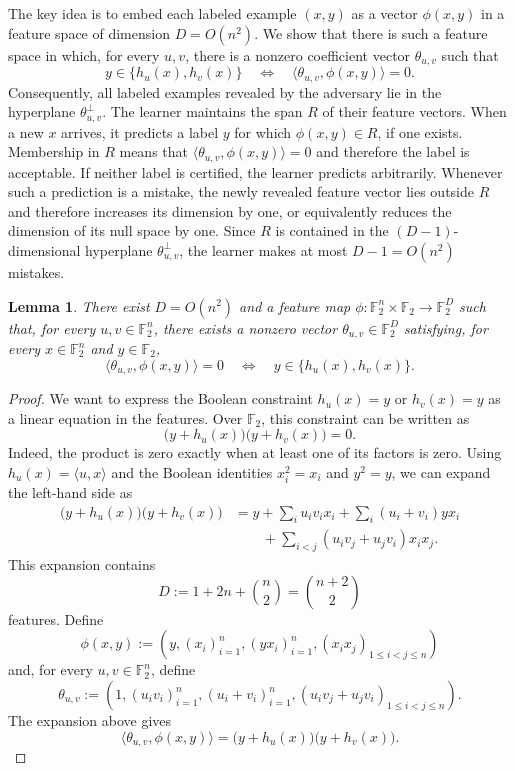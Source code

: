 \documentclass[11pt]{article}
\newtheorem{lemma}[theorem]{Lemma}
\theoremstyle{remark}
\begin{document}
The key idea is to embed each labeled example $(x,y)$ as a vector $\phi(x,y)$ in a feature space of dimension $D=O(n^2)$. We show that there is such a feature space in which, for every $u,v$, there is a nonzero coefficient vector $\theta_{u,v}$ such that
\[
    y\in\{h_u(x),h_v(x)\}
    \quad\Longleftrightarrow\quad
    \langle\theta_{u,v},\phi(x,y)\rangle=0.
\]
Consequently, all labeled examples revealed by the adversary lie in the hyperplane $\theta_{u,v}^{\perp}$. The learner maintains the span $R$ of their feature vectors. When a new $x$ arrives, it predicts a label $y$ for which $\phi(x,y)\in R$, if one exists. Membership in $R$ means that $\langle\theta_{u,v},\phi(x,y)\rangle=0$ and therefore the label is acceptable. If neither label is certified, the learner predicts arbitrarily. Whenever such a prediction is a mistake, the newly revealed feature vector lies outside $R$ and therefore increases its dimension by one, or equivalently reduces the dimension of its null space by one. Since $R$ is contained in the $(D-1)$-dimensional hyperplane $\theta_{u,v}^{\perp}$, the learner makes at most $D-1=O(n^2)$ mistakes.

\begin{lemma}
There exist $D=O(n^2)$ and a feature map $\phi:\mathbb{F}_2^n\times\mathbb{F}_2\to\mathbb{F}_2^D$ such that, for every $u,v\in\mathbb{F}_2^n$, there exists a nonzero vector $\theta_{u,v}\in\mathbb{F}_2^D$ satisfying, for every $x\in\mathbb{F}_2^n$ and $y\in\mathbb{F}_2$,
\[
    \langle\theta_{u,v},\phi(x,y)\rangle=0
    \quad\Longleftrightarrow\quad
    y\in\{h_u(x),h_v(x)\}.
\]
\end{lemma}

\begin{proof}
We want to express the Boolean constraint $h_u(x)=y$ or $h_v(x)=y$ as a linear equation in the features. Over $\mathbb{F}_2$, this constraint can be written as
\[
    \bigl(y+h_u(x)\bigr)\bigl(y+h_v(x)\bigr)=0.
\]
Indeed, the product is zero exactly when at least one of its factors is zero. Using $h_u(x)=\langle u,x\rangle$ and the Boolean identities $x_i^2=x_i$ and $y^2=y$, we can expand the left-hand side as
\begin{align*}
    \bigl(y+h_u(x)\bigr)\bigl(y+h_v(x)\bigr)
    &=y+\sum_i u_iv_ix_i+\sum_i(u_i+v_i)yx_i \\
    &\qquad+\sum_{i<j}(u_iv_j+u_jv_i)x_ix_j.
\end{align*}
This expansion contains
\[
    D:=1+2n+\binom{n}{2}=\binom{n+2}{2}
\]
features. Define
\[
    \phi(x,y):=\left(y,(x_i)_{i=1}^n,(yx_i)_{i=1}^n,(x_ix_j)_{1\leq i<j\leq n}\right)
\]
and, for every $u,v\in\mathbb{F}_2^n$, define
\[
    \theta_{u,v}:=\left(1,(u_iv_i)_{i=1}^n,(u_i+v_i)_{i=1}^n,(u_iv_j+u_jv_i)_{1\leq i<j\leq n}\right).
\]
The expansion above gives
\[
    \langle\theta_{u,v},\phi(x,y)\rangle
    =\bigl(y+h_u(x)\bigr)\bigl(y+h_v(x)\bigr).
\]
\end{proof}
\end{document}
